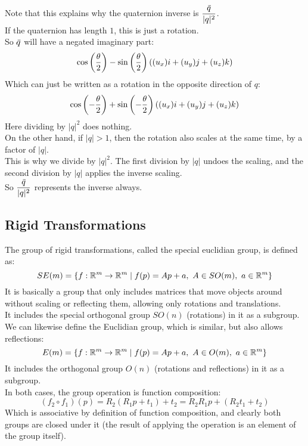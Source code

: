 \documentclass[12pt]{article}
\begin{document}
Note that this explains why
the quaternion inverse is 
$\dfrac{\,\overline{\!{q}}}{|q|^2}$. \\
If the quaternion has length $1$,
this is just a rotation. \\
So $\,\overline{\!{q}}$
will have a negated imaginary part:
\[ \cos \left( \dfrac{\theta}{2} \right)
- \sin \left( \dfrac{\theta}{2} \right)
((u_x)i + (u_y)j + (u_z)k) \]
Which can just be written as a rotation in 
the opposite direction of $q$:
\[\cos \left( -\dfrac{\theta}{2} \right)
+ \sin \left( -\dfrac{\theta}{2} \right)
((u_x)i + (u_y)j + (u_z)k) \]
Here dividing by $|q|^2$ does nothing. \\
On the other hand, if $|q| > 1$,
then the rotation also scales at the same time,
by a factor of $|q|$. \\
This is why we divide by $|q|^2$.
The first division by $|q|$ undoes the
scaling, and the second division by $|q|$
applies the inverse scaling. \\
So $\dfrac{\,\overline{\!{q}}}{|q|^2}$
represents the inverse always. \\

\newpage

\subsection*{Rigid Transformations}

The group of rigid transformations,
called the special euclidian group,
is defined as:
\[ SE(m) = \left\{ f : \mathbb{R}^m \to 
\mathbb{R}^m \mid f(p) = Ap + a,\ A 
\in SO(m),\ a \in \mathbb{R}^m \right\} \]
It is basically a group that only includes
matrices that move objects around without scaling
or reflecting them,
allowing only rotations and translations. \\
It includes the special orthogonal group $SO(n)$
(rotations) in it as a subgroup. \\

We can likewise define the Euclidian group,
which is similar, but also allows reflections:
\[ E(m) = \left\{ f : \mathbb{R}^m \to 
\mathbb{R}^m \mid f(p) = Ap + a,\ A 
\in O(m),\ a \in \mathbb{R}^m \right\} \]
It includes the orthogonal group $O(n)$
(rotations and reflections) in it as a subgroup. \\

In both cases,
the group operation is function composition:
\[ (f_2 \circ f_1)(p) = R_2(R_1p + t_1) + t_2
= R_2R_1p + (R_2t_1 + t_2) \] 
Which is associative by definition of function
composition, and clearly both groups 
are closed under it
(the result of applying the operation
is an element of the group itself). \\
\end{document}
